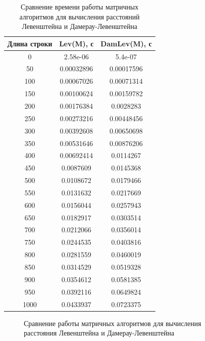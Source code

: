 \documentclass[14pt]{report}
\begin{document}
\begin{table}
	\caption{Сравнение времени работы матричных алгоритмов для вычисления расстояний Левенштейна и Дамерау-Левенштейна}
		\begin{tabular}{|c | c | c |}
	 	\hline
		Длина строки & Lev(M), с & DamLev(M), с \\ [0.5ex]
	 	\hline\hline
		0 & 2.58e-06 & 5.4e-07 \\
		\hline
		50 & 0.00032896 & 0.00017596 \\
		\hline
		100 & 0.00067026 & 0.00071314 \\
		\hline
		150 & 0.00100624 & 0.00159782 \\
		\hline
		200 & 0.00176384 & 0.0028283 \\
		\hline
		250 & 0.00273216 & 0.00448456 \\
		\hline
		300 & 0.00392608 & 0.00650698 \\
		\hline
		350 & 0.00531646 & 0.00876206 \\
		\hline
		400 & 0.00692414 & 0.0114267 \\
		\hline
		450 & 0.0087609 & 0.0145368 \\
		\hline
		500 & 0.0108672 & 0.0179466 \\
		\hline
		550 & 0.0131632 & 0.0217669 \\
		\hline
		600 & 0.0156044 & 0.0257943 \\
		\hline
		650 & 0.0182917 & 0.0303514 \\
		\hline
		700 & 0.0212066 & 0.0356014 \\
		\hline
		750 & 0.0244535 & 0.0403816 \\
		\hline
		800 & 0.0281559 & 0.0460019 \\
		\hline
		850 & 0.0314529 & 0.0519328 \\
		\hline
		900 & 0.0354612 & 0.0581385 \\
		\hline
		950 & 0.0392116 & 0.0649824 \\
		\hline
		1000 & 0.0433937 & 0.0723375 \\
		\hline
		\end{tabular}
\end{table}

\begin{figure}
	\caption{Сравнение работы матричных алгоритмов для вычисления расстояния Левенштейна и Дамерау-Левенштейна}
\end{figure}
\end{document}
